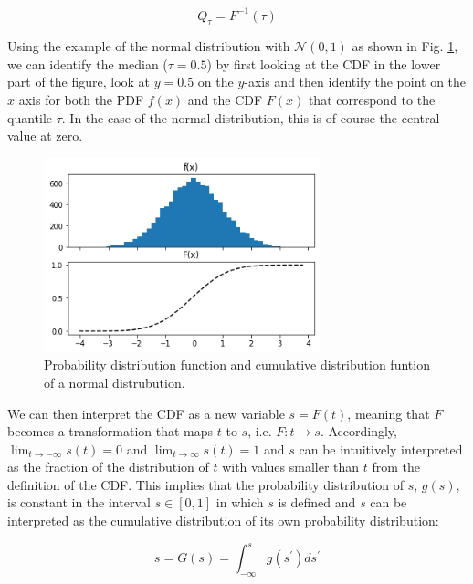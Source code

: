 \documentclass[BCOR=1mm, DIV=calc,10pt,
twoside=true,
twocolumn,
headings=normal]{scrartcl}
\newcommand{\fig}{Fig. }
\begin{document}
\begin{equation}
Q_\tau = F^{-1}(\tau)
\end{equation}

Using the example of the normal distribution with $\mathcal{N}(0,1)$ as shown in \fig \ref{fig:PdfCdf}, we can identify the median ($\tau = 0.5$) by first looking at the CDF in the lower part of the figure, look at $y=0.5$ on the $y$-axis and then identify the point on the $x$ axis for both the PDF $f(x)$ and the CDF $F(x)$ that correspond to the quantile $\tau$. In the case of the normal distribution, this is of course the central value at zero.

\begin{figure}
\begin{center}
\includegraphics[width=8cm]{../figures/PdfCdf}
\caption{\label{fig:PdfCdf} Probability distribution function and cumulative distribution funtion of a normal distrubution.}
\end{center}
\end{figure}

We can then interpret the CDF as a new variable $s = F(t)$, meaning that $F$ becomes a transformation that maps $t$ to $s$, i.e. $F:t \to s$. Accordingly,  $\lim_{t \to -\infty}s(t) = 0$ and $\lim_{t \to \infty}s(t) = 1$ and $s$ can be intuitively interpreted as the fraction of the distribution of $t$ with values smaller than $t$ from the definition of the CDF. This implies that the probability distribution of $s$, $g(s)$, is constant in the interval $s\in [0,1]$ in which $s$ is defined and $s$ can be interpreted as the cumulative distribution of its own probability distribution:

\begin{equation}
s = G(s) = \int_{-\infty}^{s} g(s^\prime) ds^\prime
\end{equation}
\end{document}
